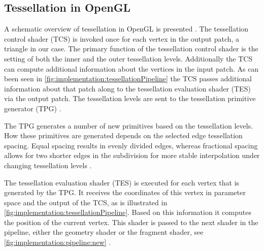 \subsection{Tessellation in OpenGL}
\label{ss:implementation:pipeline}

	A schematic overview of tessellation in OpenGL is presented .
	The tessellation control shader (TCS) is invoked once for each vertex in the output patch, a triangle in our case. 
	The primary function of the tessellation control shader is the setting of both the inner and the outer tessellation levels. Additionally the TCS can compute additional information about the vertices in the input patch. 
	As can been seen in \cref{fig:implementation:tessellationPipeline} the TCS passes additional information about that patch along to the tessellation evaluation shader (TES) via the output patch. The tessellation levels are sent to the tessellation primitive generator (TPG) \cite{wolff2013opengl}.

	The TPG generates a number of new primitives based on the tessellation levels. How these primitives are generated depends on the selected edge tessellation spacing. Equal spacing results in evenly divided edges, whereas fractional spacing allows for two shorter edges in the subdivision for more stable interpolation under changing tessellation levels \cite{wolff2013opengl,openGL41Core}.

	The tessellation evaluation shader (TES) is executed for each vertex that is generated by the TPG. 
	It receives the coordinates of this vertex in parameter space and the output of the TCS, as is illustrated in \cref{fig:implementation:tessellationPipeline}. 
	Based on this information it computes the position of the current vertex. 
	This shader is passed to the next shader in the pipeline, either the geometry shader or the fragment shader, see \cref{fig:implementation:pipeline:new} \cite{wolff2013opengl}.

